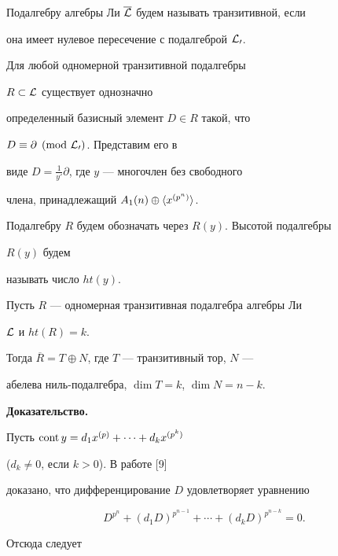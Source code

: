 Подалгебру алгебры Ли $\overline{\cal L}$ будем называть транзитивной, если


она имеет нулевое пересечение с подалгеброй $\cal L_0$.





Для любой одномерной транзитивной подалгебры


$R\subset\cal L$ существует однозначно


определенный базисный элемент $D\in R$ такой, что


$D\equiv\partial\pmod{\cal L_0}$. Представим его в


виде $D=\frac{1}{y'}\partial$, где $y$ --- многочлен без свободного


члена, принадлежащий $A_1(n)\oplus\langle x^{(p^n)}\rangle$.


Подалгебру $R$ будем обозначать через $R(y)$. Высотой подалгебры


$R(y)$ будем


называть число $ht(y)$.





\begin{thm}


Пусть $R$ --- одномерная транзитивная подалгебра алгебры Ли


$\cal L$ и $ht(R)=k$.


Тогда $\overline R=T\oplus N$, где $T$ --- транзитивный тор, $N$ ---


абелева ниль-подалгебра, $\dim T=k$, $\dim N=n-k$.


\end{thm}





{\bf Доказательство.}


Пусть $\operatorname{cont} y=d_1x^{(p)}+\dotsb+d_kx^{(p^k)}$


($d_k\ne 0$, если $k>0$). В работе [9]


доказано, что дифференцирование $D$ удовлетворяет уравнению


$$


D^{p^n}+(d_1D)^{p^{n-1}}+\dotsb+(d_kD)^{p^{n-k}}=0.


$$


Отсюда следует


